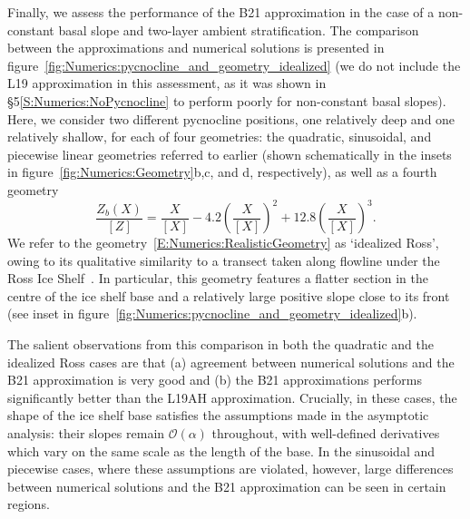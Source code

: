 \documentclass[openacc]{rsproca_new}%
\newcommand{\order}[1]{\mathcal{O}(#1)}
\begin{document}
Finally, we assess the performance of the B21 approximation in the case of a non-constant basal slope and two-layer ambient stratification. The comparison between the approximations and numerical solutions is presented in figure~\ref{fig:Numerics:pycnocline_and_geometry_idealized} (we do not include the L19 approximation in this assessment, as it was shown in \S5\ref{S:Numerics:NoPycnocline} to perform poorly for non-constant basal slopes). Here, we consider two different pycnocline positions, one relatively deep and one relatively shallow, for each of four geometries: the quadratic, sinusoidal, and piecewise linear geometries referred to earlier (shown schematically in the insets in figure~\ref{fig:Numerics:Geometry}b,c, and d, respectively), as well as a fourth geometry 
\begin{equation}\label{E:Numerics:RealisticGeometry}
\frac{Z_b(X)}{\left[Z\right]}= \frac{X}{\left[X\right]} -4.2\left(\frac{X}{\left[X\right]}\right)^2 + 12.8\left(\frac{X}{\left[X\right]}\right)^3.
\end{equation}
We refer to the geometry~\eqref{E:Numerics:RealisticGeometry} as `idealized Ross', owing to its qualitative similarity to a transect taken along flowline under the Ross Ice Shelf~\citep{Shabtaie1987JGeophysResSolidEarth}. In particular, this geometry features a flatter section in the centre of the ice shelf base and a relatively large positive slope close to its front (see inset in figure~\ref{fig:Numerics:pycnocline_and_geometry_idealized}b).

The salient observations from this comparison in both the quadratic and the idealized Ross cases are that (a) agreement between numerical solutions and the B21 approximation is very good and (b) the B21 approximations performs significantly better than the L19AH approximation. Crucially, in these cases, the shape of the ice shelf base satisfies the assumptions made in the asymptotic analysis: their slopes remain $\order{\alpha}$ throughout, with well-defined derivatives which vary on the same scale as the length of the base. In the sinusoidal and piecewise cases, where these assumptions are violated, however, large differences between numerical solutions and the B21 approximation can be seen in certain regions.
\end{document}
